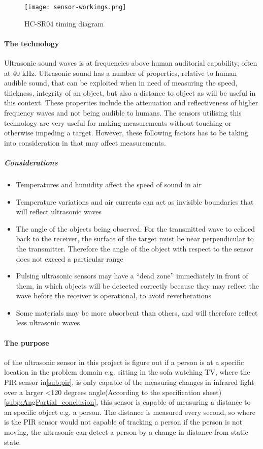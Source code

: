 \begin{figure}[htbp]
  \centering
  \texttt{[image: sensor-workings.png]}
  \caption{HC-SR04 timing diagram}
  \label{fig:sensor-workings}
\end{figure}

\paragraph{The technology}
Ultrasonic sound waves is at frequencies above human auditorial capability, often at 40 kHz. Ultrasonic sound has a number of properties, relative to human audible sound, that can be exploited when in need of measuring the speed\cite{ultrasound}, thickness\cite{ultrasound2}, integrity\cite{ultrasound2} of an object, but also a distance to object as will be useful in this context. These properties include the attenuation and reflectiveness of higher frequency waves and not being audible to humans. The sensors utilising this technology are very useful for making measurements without touching or otherwise impeding a target. However, these following factors has to be taking into consideration in that may affect measurements.
  \subparagraph{Considerations}\label{sup:cons}
  \begin{itemize}
  \item Temperatures and humidity affect the speed of sound in air
  \item Temperature variations and air currents can act as invisible boundaries that will reflect ultrasonic waves
  \item The angle of the objects being observed. For the transmitted wave to echoed back to the receiver, the surface of the target must be  near perpendicular to the transmitter. Therefore the angle of the object with respect to the sensor does not exceed a particular range
  \item Pulsing ultrasonic sensors may have a “dead zone” immediately in front of them, in which objects will be detected correctly because they may reflect the wave before the receiver is operational, to avoid reverberations
  \item Some materials may be more absorbent than others, and will therefore reflect less ultrasonic waves
  \end{itemize}

\paragraph{The purpose} of the ultrasonic sensor in this project is figure out if a person is at a specific location in the problem domain e.g. sitting in the sofa watching TV, where the PIR sensor in\cref{sub:pir}, is only capable of the measuring changes in infrared light over a larger <120 degrees angle(According to the specification sheet)\cref{subp:AngPartial_conclusion}, this sensor is capable of measuring a distance to an specific object e.g. a person. The distance is measured every second, so where is the PIR sensor would not capable of tracking a person if the person is not moving, the ultrasonic can detect a person by a change in distance from static state.

